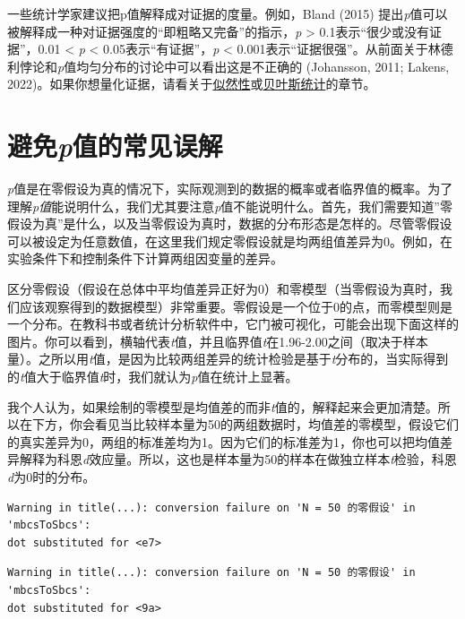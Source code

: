 \documentclass[
  letterpaper,
  DIV=11,
  numbers=noendperiod]{scrreprt}
\begin{document}
一些统计学家建议把p值解释成对证据的度量。例如，Bland (2015)
提出\emph{p}值可以被解释成一种对证据强度的``即粗略又完备''的指示，\emph{p}
\textgreater{} 0.1表示``很少或没有证据''，0.01 \textless{} \emph{p}
\textless{} 0.05表示``有证据''，\emph{p} \textless{}
0.001表示``证据很强''。从前面关于林德利悖论和\emph{p}值均匀分布的讨论中可以看出这是不正确的
(Johansson, 2011; Lakens,
2022)。如果你想量化证据，请看关于\protect\hyperlink{likelihoods}{似然性}或\protect\hyperlink{bayes}{贝叶斯统计}的章节。

\hypertarget{sec-misconceptions}{%
\section{\texorpdfstring{避免\emph{p}值的常见误解}{避免p值的常见误解}}\label{sec-misconceptions}}

\emph{p}值是在零假设为真的情况下，实际观测到的数据的概率或者临界值的概率。为了理解\emph{p值}能说明什么，我们尤其要注意\emph{p}值不能说明什么。首先，我们需要知道''零假设为真''是什么，以及当零假设为真时，数据的分布形态是怎样的。尽管零假设可以被设定为任意数值，在这里我们规定零假设就是均两组值差异为0。例如，在实验条件下和控制条件下计算两组因变量的差异。

区分零假设（假设在总体中平均值差异正好为0）和零模型（当零假设为真时，我们应该观察得到的数据模型）非常重要。零假设是一个位于0的点，而零模型则是一个分布。在教科书或者统计分析软件中，它门被可视化，可能会出现下面这样的图片。你可以看到，横轴代表\emph{t}值，并且临界值\emph{t}在1.96-2.00之间（取决于样本量）。之所以用\emph{t}值，是因为比较两组差异的统计检验是基于\emph{t}分布的，当实际得到的\emph{t}值大于临界值\emph{t}时，我们就认为\emph{p}值在统计上显著。

我个人认为，如果绘制的零模型是均值差的而非\emph{t}值的，解释起来会更加清楚。所以在下方，你会看见当比较样本量为50的两组数据时，均值差的零模型，假设它们的真实差异为0，两组的标准差均为1。因为它们的标准差为1，你也可以把均值差异解释为科恩\emph{d}效应量。所以，这也是样本量为50的样本在做独立样本\emph{t}检验，科恩\emph{d}为0时的分布。

\begin{verbatim}
Warning in title(...): conversion failure on 'N = 50 的零假设' in 'mbcsToSbcs':
dot substituted for <e7>
\end{verbatim}

\begin{verbatim}
Warning in title(...): conversion failure on 'N = 50 的零假设' in 'mbcsToSbcs':
dot substituted for <9a>
\end{verbatim}
\end{document}
